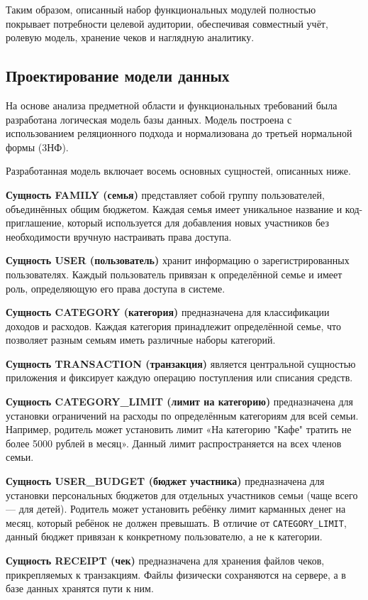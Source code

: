 Таким образом, описанный набор функциональных модулей полностью покрывает потребности целевой аудитории, обеспечивая совместный учёт, ролевую модель, хранение чеков и наглядную аналитику. 


\subsection{Проектирование модели данных}

На основе анализа предметной области и функциональных требований была разработана логическая модель базы данных. Модель построена с использованием реляционного подхода и нормализована до третьей нормальной формы (3НФ).

Разработанная модель включает восемь основных сущностей, описанных ниже.

\textbf{Сущность FAMILY (семья)} представляет собой группу пользователей, объединённых общим бюджетом. Каждая семья имеет уникальное название и код-приглашение, который используется для добавления новых участников без необходимости вручную настраивать права доступа.

\textbf{Сущность USER (пользователь)} хранит информацию о зарегистрированных пользователях. Каждый пользователь привязан к определённой семье и имеет роль, определяющую его права доступа в системе.

\textbf{Сущность CATEGORY (категория)} предназначена для классификации доходов и расходов. Каждая категория принадлежит определённой семье, что позволяет разным семьям иметь различные наборы категорий.

\textbf{Сущность TRANSACTION (транзакция)} является центральной сущностью приложения и фиксирует каждую операцию поступления или списания средств.

\textbf{Сущность CATEGORY\_LIMIT (лимит на категорию)} предназначена для установки ограничений на расходы по определённым категориям для всей семьи. Например, родитель может установить лимит «На категорию "Кафе" тратить не более 5000 рублей в месяц». Данный лимит распространяется на всех членов семьи.

\textbf{Сущность USER\_BUDGET (бюджет участника)} предназначена для установки персональных бюджетов для отдельных участников семьи (чаще всего — для детей). Родитель может установить ребёнку лимит карманных денег на месяц, который ребёнок не должен превышать. В отличие от \texttt{CATEGORY\_LIMIT}, данный бюджет привязан к конкретному пользователю, а не к категории.

\textbf{Сущность RECEIPT (чек)} предназначена для хранения файлов чеков, прикрепляемых к транзакциям. Файлы физически сохраняются на сервере, а в базе данных хранятся пути к ним.

